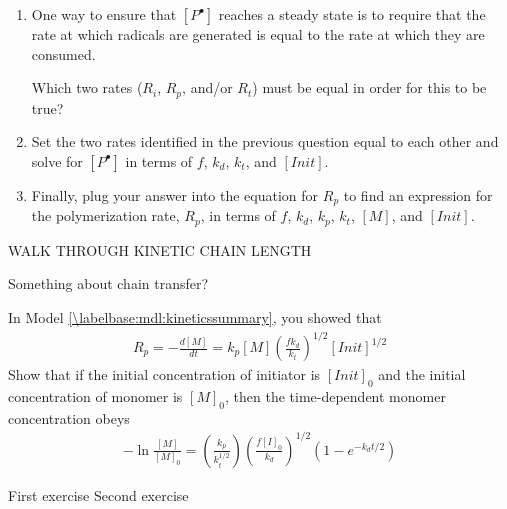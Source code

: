 \begin{activity}
\begin{ctqs}
		\begin{enumerate}
			\item One way to ensure that $[P^{\bullet}]$ reaches a steady state is to require that the rate at which radicals are generated is equal to the rate at which they are consumed.
			
				Which two rates ($R_i$, $R_p$, and/or $R_t$) must be equal in order for this to be true?
				
			\item Set the two rates identified in the previous question equal to each other and solve for $[P^{\bullet}]$ in terms of $f$, $k_d$, $k_t$, and $[Init]$.
			
			\item Finally, plug your answer into the equation for $R_p$ to find an expression for the polymerization rate, $R_p$, in terms of $f$, $k_d$, $k_p$, $k_t$, $[M]$, and $[Init]$.
		\end{enumerate}
	
	\question WALK THROUGH KINETIC CHAIN LENGTH
	
\end{ctqs}

		
\begin{model}
	Something about chain transfer?
\end{model}



\begin{exercises}

	\exercise In Model \ref{\labelbase:mdl:kineticssummary}, you showed that
		\begin{align*}
			R_p = -\frac{d[M]}{dt} = k_p [M] \left(\frac{f k_d}{k_t}\right)^{1/2}[Init]^{1/2}
		\end{align*}
		Show that if the initial concentration of initiator is $[Init]_0$ and the initial concentration of monomer is $[M]_0$, then the time-dependent monomer concentration obeys
		\begin{align*}
			-\ln\frac{[M]}{[M]_0} = \left(\frac{k_p}{k_t^{1/2}}\right)\left(\frac{f[I]_0}{k_d}\right)^{1/2}\left(1 - e^{-k_d t/2}\right)
		\end{align*}
	
\end{exercises}


\begin{problems}

	\problem First exercise
	\problem Second exercise
	
\end{problems}


	
\end{activity}